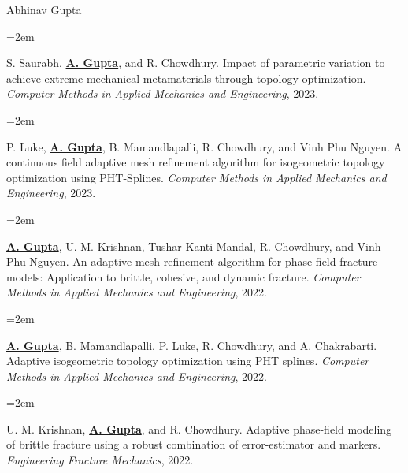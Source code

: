 \documentclass[  usegeometry%
]{scrartcl}
\newcommand{\MarginText}[1]{\marginpar{\raggedleft\itshape\small#1}} %
\newcommand{\Description}[1]{\hangindent=2em\hangafter=0\noindent\raggedright\footnotesize{#1}\par\normalsize\vspace{1em}} %
\begin{document}
\begin{cv}{{Abhinav Gupta}}
\vspace{1em}

\Description{\MarginText{Publications}S. Saurabh, \textbf{\underline{A. Gupta}}, and R. Chowdhury. Impact of parametric variation to achieve extreme mechanical metamaterials through topology optimization. \emph{Computer Methods in Applied Mechanics and Engineering}, 2023.} 

\Description{P. Luke, \textbf{\underline{A. Gupta}}, B. Mamandlapalli, R. Chowdhury, and Vinh Phu Nguyen. A continuous field adaptive mesh refinement algorithm for isogeometric topology optimization using PHT-Splines. \emph{Computer Methods in Applied Mechanics and Engineering}, 2023.}  


\Description{\textbf{\underline{A. Gupta}}, U. M. Krishnan, Tushar Kanti Mandal, R. Chowdhury, and Vinh Phu Nguyen. An adaptive mesh refinement algorithm for phase-field fracture models: Application to brittle, cohesive, and dynamic fracture. \emph{Computer Methods in Applied Mechanics and Engineering}, 2022.}   

\vspace{-0.5em} %

\Description{\textbf{\underline{A. Gupta}}, B. Mamandlapalli, P. Luke, R. Chowdhury, and A. Chakrabarti. Adaptive isogeometric topology optimization using PHT splines. \emph{Computer Methods in Applied Mechanics and Engineering}, 2022.}
\vspace{-0.5em} %



\Description{U. M. Krishnan, \textbf{\underline{A. Gupta}}, and R. Chowdhury. Adaptive phase-field modeling of brittle fracture using a robust combination of error-estimator and markers. \emph{Engineering Fracture Mechanics}, 2022.}




\end{cv}
\end{document}
